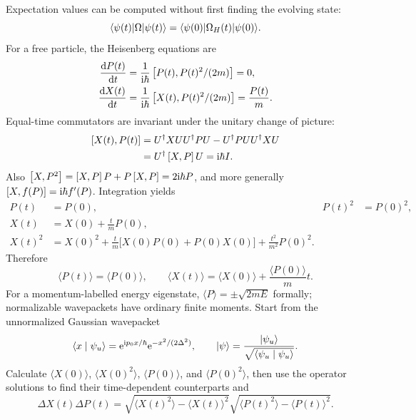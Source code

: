 Expectation values can be computed without first finding the evolving state:
\[
 \langle \psi(t)\rvert \Omega\lvert \psi(t)\rangle
 =\langle \psi(0)\rvert \Omega_H(t)\lvert \psi(0)\rangle.
\]
For a free particle, the Heisenberg equations are
\begin{align*}
 \frac{\mathop{}\!\mathrm{d} P(t)}{\mathop{}\!\mathrm{d} t}&=\frac1{\mathrm{i}\hbar}
       \left[P(t),P(t)^2/(2m)\right]=0,\\
 \frac{\mathop{}\!\mathrm{d} X(t)}{\mathop{}\!\mathrm{d} t}&=\frac1{\mathrm{i}\hbar}
       \left[X(t),P(t)^2/(2m)\right]=\frac{P(t)}m.
\end{align*}
Equal-time commutators are invariant under the unitary change of picture:
\begin{align*}
 \left[X(t),P(t)\right]
 &=U^\dagger XUU^\dagger PU-U^\dagger PUU^\dagger XU\\
 &=U^\dagger\left[X,P\right] U=\mathrm{i}\hbar I.
\end{align*}
Also $\left[X,P^2\right]=\left[X,P\right] P+P\left[X,P\right]=2\mathrm{i}\hbar P$,
and more generally $\left[X,f(P)\right]=\mathrm{i}\hbar f'(P)$.
Integration yields
\begin{align*}
 P(t)&=P(0),&P(t)^2&=P(0)^2,\\
 X(t)&=X(0)+\frac{t}{m}P(0),\\
 X(t)^2&=X(0)^2+\frac{t}{m}\bigl[X(0)P(0)+P(0)X(0)\bigr]
                  +\frac{t^2}{m^2}P(0)^2.
\end{align*}
Therefore
\[
 \langle P(t)\rangle=\langle P(0)\rangle,\qquad
 \langle X(t)\rangle=\langle X(0)\rangle+\frac{\langle P(0)\rangle}{m}t.
\]
For a momentum-labelled energy eigenstate, $\langle P\rangle=\pm\sqrt{2mE}$
formally; normalizable wavepackets have ordinary finite moments.
Start from the unnormalized Gaussian wavepacket
\[
 \langle x\mid \psi_u\rangle=\mathrm{e}^{\mathrm{i} p_0x/\hbar}\mathrm{e}^{-x^2/(2\Delta^2)},\qquad
 \lvert \psi\rangle=\frac{\lvert \psi_u\rangle}{\sqrt{\langle \psi_u\mid \psi_u\rangle}}.
\]
Calculate $\langle X(0)\rangle$, $\langle X(0)^2\rangle$,
$\langle P(0)\rangle$, and $\langle P(0)^2\rangle$, then use the operator
solutions to find their time-dependent counterparts and
\[
 \Delta X(t)\Delta P(t)=
 \sqrt{\langle X(t)^2\rangle-\langle X(t)\rangle^2}
 \sqrt{\langle P(t)^2\rangle-\langle P(t)\rangle^2}.
\]
